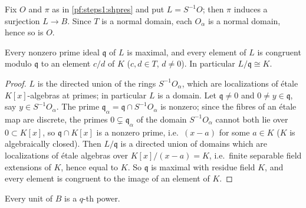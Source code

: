 Fix $O$ and $\pi$ as in \cref{pf:steps1:shpres} and put $L=S^{-1}O$; then $\pi$ induces a surjection $L\to B$. Since
$T$ is a normal domain, each $O_\alpha$ is a normal domain, hence so is $O$.

\begin{lemma}\label{pf:steps1:primes}
Every nonzero prime ideal $\mathfrak q$ of $L$ is maximal, and every element of $L$ is congruent modulo $\mathfrak q$
to an element $c/d$ of $K$ ($c,d\in T$, $d\ne0$). In particular $L/\mathfrak q\cong K$.
\end{lemma}

\begin{proof}
$L$ is the directed union of the rings $S^{-1}O_\alpha$, which are localizations of \'etale $K[x]$-algebras at
primes; in particular $L$ is a domain. Let $\mathfrak q\ne0$ and $0\neq y\in\mathfrak q$, say $y\in S^{-1}O_\alpha$.
The prime $\mathfrak q_\alpha=\mathfrak q\cap S^{-1}O_\alpha$ is nonzero; since the fibres of an \'etale map are
discrete, the primes $0\subsetneq\mathfrak q_\alpha$ of the domain $S^{-1}O_\alpha$ cannot both lie over
$0\subset K[x]$, so $\mathfrak q\cap K[x]$ is a nonzero prime, i.e.\ $(x-a)$ for some $a\in K$ ($K$ is algebraically
closed). Then $L/\mathfrak q$ is a directed union of domains which are localizations of \'etale algebras over
$K[x]/(x-a)=K$, i.e.\ finite separable field extensions of $K$, hence equal to $K$. So $\mathfrak q$ is maximal with
residue field $K$, and every element is congruent to the image of an element of $K$.
\end{proof}

\begin{lemma}[Units]\label{pf:steps1:units}
Every unit of $B$ is a $q$-th power.
\end{lemma}

